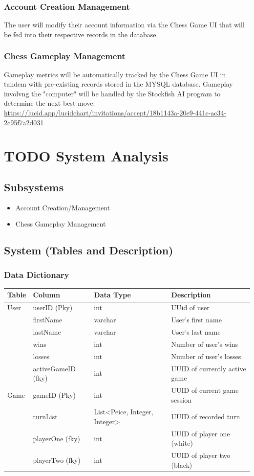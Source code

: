 \documentclass[11pt]{article}
\begin{document}
\subsubsection{Account Creation Management}
\label{sec:orga6baabb}
The user will modify their account information via the Chess Game
UI that will be fed into their respective records in the database.
\subsubsection{Chess Gameplay Management}
\label{sec:orgb3b815a}
Gameplay metrics will be automatically tracked by the Chess Game
UI in tandem with pre-existing records stored in the MYSQL
database.
Gameplay involvng the "computer" will be handled by the Stockfish
AI program to determine the next best move.
\url{https://lucid.app/lucidchart/invitations/accept/18b1143a-20e9-441c-ac34-2c95f7a2d031}
\section{{\bfseries\sffamily TODO} System Analysis}
\label{sec:org8fe2722}
\subsection{Subsystems}
\label{sec:orgaab7a21}
\begin{itemize}
\item Account Creation/Management
\item Chess Gameplay Management
\end{itemize}
\subsection{System (Tables and Description)}
\label{sec:org4de7c07}
\subsubsection{Data Dictionary}
\label{sec:org4dcca3e}
\begin{center}
\begin{tabular}{llll}
Table & Column & Data Type & Description\\
\hline
User & userID (Pky) & int & UUid of user\\
 & firstName & varchar & User's first name\\
 & lastName & varchar & User's last name\\
 & wins & int & Number of user's wins\\
 & losses & int & Number of user's losses\\
 & activeGameID (fky) & int & UUID of currently active game\\
Game & gameID (Pky) & int & UUID of current game session\\
 & turnList & List<Peice, Integer, Integer> & UUID of recorded turn\\
 & playerOne (fky) & int & UUID of player one (white)\\
 & playerTwo (fky) & int & UUID of player two (black)\\
\end{tabular}
\end{center}
\end{document}
